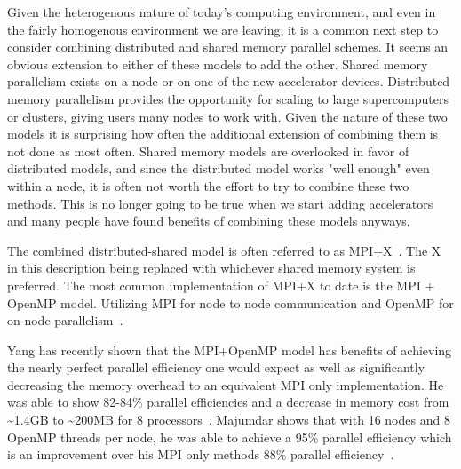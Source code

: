 %
Given the heterogenous nature of today's computing environment, and even in the fairly homogenous environment we are leaving, it is a common next step to consider combining distributed and shared memory parallel schemes.
%
It seems an obvious extension to either of these models to add the other.
%
Shared memory parallelism exists on a node or on one of the new accelerator devices.
%
Distributed memory parallelism provides the opportunity for scaling to large supercomputers or clusters, giving users many nodes to work with.
%
Given the nature of these two models it is surprising how often the additional extension of combining them is not done as most often. 
%
Shared memory models are overlooked in favor of distributed models, and since the distributed model works "well enough" even within a node, it is often not worth the effort to try to combine these two methods.
%
This is no longer going to be true when we start adding accelerators and many people have found benefits of combining these models anyways.
%

%
The combined distributed-shared model is often referred to as MPI+X~\cite{michaelwolfe2014}.
%
The X in this description being replaced with whichever shared memory system is preferred.
%
The most common implementation of MPI+X to date is the MPI + OpenMP model.
%
Utilizing MPI for node to node communication and OpenMP for on node parallelism~\cite{michaelwolfe2014}.
%

%
Yang has recently shown that the MPI+OpenMP model has benefits of achieving the nearly perfect parallel efficiency one would expect as well as significantly decreasing the memory overhead to an equivalent MPI only implementation.
%
He was able to show 82-84\% parallel efficiencies and a decrease in memory cost from \textasciitilde1.4GB to \textasciitilde200MB for 8 processors~\cite{yanghybrid}.
%
Majumdar shows that with 16 nodes and 8 OpenMP threads per node, he was able to achieve a 95\% parallel efficiency which is an improvement over his MPI only methods 88\% parallel efficiency~\cite{majumdar2000parallel}. 
%
